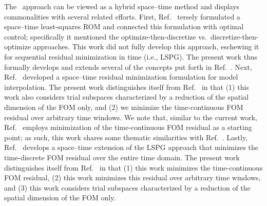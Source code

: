 \documentclass[3p,computermodern,10pt]{elsarticle}
\begin{document}
The \methodAcronym\ approach can be viewed as a hybrid space--time method and displays 
commonalities with several related efforts. 
First, Ref.~\cite{bui_thesis} tersely formulated a space--time least-squares ROM
and connected this formulation with optimal control; specifically it mentioned the
optimize-then-discretize vs.\ discretize-then-optimize approaches. This work
did not fully develop this approach, eschewing it 
for 
sequential residual minimization in time (i.e., LSPG). The present work thus
formally develops and extends several of the concepts put forth
in Ref.~\cite{bui_thesis}. Next, Ref.~\cite{constantine_strom} developed a
space--time residual minimization formulation for model interpolation.  The
present work distinguishes itself from Ref.~\cite{constantine_strom} in that
(1) this work also considers trial subspaces characterized by a reduction of
the spatial dimension of the FOM only, and (2) we
minimize the time-continuous FOM residual over arbitrary time
windows. We note that,
similar to the current work, Ref.~\cite{constantine_strom} employs
minimization of the time-continuous FOM residual as a starting point; as such,
this work shares some thematic similarities with
Ref.~\cite{constantine_strom}.  Lastly, Ref.~\cite{choi_stlspg} develops a
space--time extension of the LSPG approach that minimizes the time-discrete
FOM residual over the entire time domain.  The present work distinguishes
itself from Ref.~\cite{choi_stlspg} in that (1) this work minimizes the
time-continuous FOM residual, (2) this work minimizes this residual over
arbitrary time windows, and (3) this work considers trial subspaces
characterized by a reduction of the spatial dimension of the FOM only.
\end{document}
